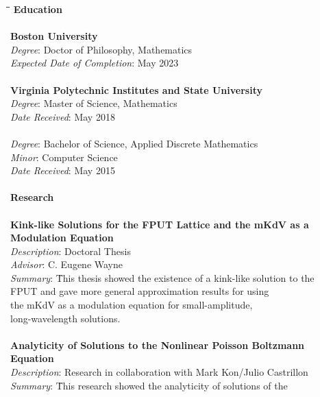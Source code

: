 \begin{center}
\begin{tabbing}
	\hspace*{1cm}\=\hspace*{1cm}\=\hspace*{2.5cm}\= \kill
	\textbf{\large{Education}}  \\  
	\\
	\> {\textbf{Boston University}} \\
	\> \> \emph{Degree}: Doctor of Philosophy, Mathematics   \\
	\> \>\emph{Expected Date of Completion}: May 2023 \\
	\> \\
	\> {\textbf{Virginia Polytechnic Institutes and State University}} \\
	\> \> \emph{Degree}: Master of Science, Mathematics  \\
	\>\>\emph{Date Received}: May 2018 \\
	\> \\
	\> \> \emph{Degree}: Bachelor of Science, Applied Discrete Mathematics \\
	\> \> \emph{Minor}: Computer Science \\
	\> \> \emph{Date Received}: May 2015 \\
	\> \\
	\textbf{\large{Research}}    \\
	\\
	\> \textbf{{Kink-like Solutions for the FPUT Lattice and the mKdV as a}}\\
	\> \textbf{{Modulation Equation}} \\
	\> \> \emph{Description}: Doctoral Thesis \\
	\> \> \emph{Advisor}: C. Eugene Wayne \\
	\> \> \emph{Summary}: \= This thesis showed the existence of a kink-like solution to the \\
	\> \> \> FPUT and gave more general approximation  results for using \\
	\> \> \> the mKdV as a modulation equation for small-amplitude, \\
	\> \> \> long-wavelength solutions. \\
	\> \\
	\> \textbf{{Analyticity of Solutions to the Nonlinear Poisson Boltzmann}} \\ 
	\> \textbf{{Equation}} \\
	\> \> \emph{Description}: Research in collaboration with Mark Kon/Julio Castrillon \\
	\> \> \emph{Summary}: \= This research showed the analyticity of solutions of the\\

\end{tabbing}
\end{center}
